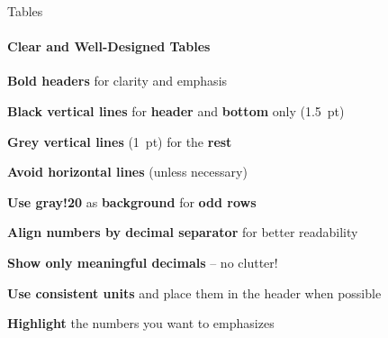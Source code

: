 \documentclass[aspectratio=169]{beamer}
\begin{document}
\begin{frame}{Tables}
    \framesubtitle{Clear and Well-Designed Tables}

    \vspace{-0.7cm}
    \begin{minipage}[t]{0.49\textwidth}
        \begin{coloredblock}
            \vspace{0.2cm}
            \begin{tugitemize}
                \item \footnotesize \textbf{Bold headers} for clarity and emphasis
                \item \textbf{Black vertical lines} for \textbf{header} and \textbf{bottom} only (1.5~pt) 
                \item \textbf{Grey vertical lines} (1~pt) for the \textbf{rest}
                \item \footnotesize \textbf{Avoid horizontal lines} (unless necessary)
                \item \footnotesize \textbf{Use gray!20} as \textbf{background} for \textbf{odd rows}
            \end{tugitemize}
        \end{coloredblock}
        \begin{coloredblock}
            \vspace{0.2cm}
            \begin{tugitemize}
                \item \footnotesize \textbf{Align numbers by decimal separator} for better readability
                \item \footnotesize \textbf{Show only meaningful decimals} – no clutter!
                \item \footnotesize \textbf{Use consistent units} and place them in the header when possible
                \item \footnotesize \textbf{Highlight} the numbers you want to emphasizes
            \end{tugitemize}
        \end{coloredblock}
    \end{minipage}
    \hfill
    \begin{minipage}[t]{0.49\textwidth}
        \vspace{2cm}
        \begin{table}[htbp]

\end{table}
\end{minipage}
\end{frame}
\end{document}
